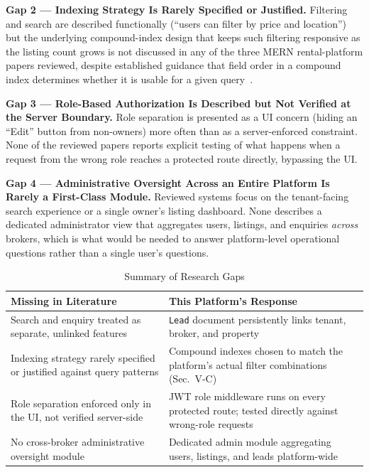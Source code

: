 \documentclass[10pt,twocolumn]{article}
\begin{document}
\smallskip
\noindent\textbf{Gap 2 --- Indexing Strategy Is Rarely Specified or Justified.} Filtering and search are described functionally (``users can filter by price and location'') but the underlying compound-index design that keeps such filtering responsive as the listing count grows is not discussed in any of the three MERN rental-platform papers reviewed, despite established guidance that field order in a compound index determines whether it is usable for a given query~\cite{nuriev2024}.

\smallskip
\noindent\textbf{Gap 3 --- Role-Based Authorization Is Described but Not Verified at the Server Boundary.} Role separation is presented as a UI concern (hiding an ``Edit'' button from non-owners) more often than as a server-enforced constraint. None of the reviewed papers reports explicit testing of what happens when a request from the wrong role reaches a protected route directly, bypassing the UI.

\smallskip
\noindent\textbf{Gap 4 --- Administrative Oversight Across an Entire Platform Is Rarely a First-Class Module.} Reviewed systems focus on the tenant-facing search experience or a single owner's listing dashboard. None describes a dedicated administrator view that aggregates users, listings, and enquiries \emph{across} brokers, which is what would be needed to answer platform-level operational questions rather than a single user's questions.

\begin{table}[t]
\centering
\caption{Summary of Research Gaps}
\label{tab:gaps}
\small
\begin{tabular}{@{}p{3.7cm}p{3.7cm}@{}}
\toprule
\textbf{Missing in Literature} & \textbf{This Platform's Response} \\
\midrule
Search and enquiry treated as separate, unlinked features & \texttt{Lead} document persistently links tenant, broker, and property \\
Indexing strategy rarely specified or justified against query patterns & Compound indexes chosen to match the platform's actual filter combinations (Sec.~V-C) \\
Role separation enforced only in the UI, not verified server-side & JWT role middleware runs on every protected route; tested directly against wrong-role requests \\
No cross-broker administrative oversight module & Dedicated admin module aggregating users, listings, and leads platform-wide \\
\bottomrule
\end{tabular}
\end{table}
\end{document}
